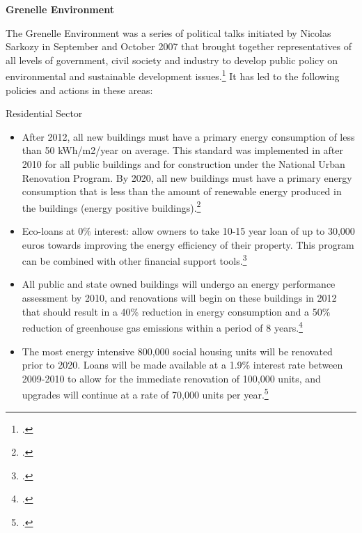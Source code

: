 \textbf{Grenelle Environment}



The Grenelle Environment was a series of political talks initiated by Nicolas Sarkozy in September and October 2007 that brought together representatives of all levels of government, civil society and industry to develop public policy on environmental and sustainable development issues.\footcite[][]{GrenelleEnvironment}
It has led to the following policies and actions in these areas:


Residential Sector
\begin{itemize}
	\item After 2012, all new buildings must have a primary energy consumption of less than 50 kWh/m2/year on average. This standard was implemented in after 2010 for all public buildings and for construction under the National Urban Renovation Program. By 2020, all new buildings must have a primary energy consumption that is less than the amount of renewable energy produced in the buildings (energy positive buildings).\footcite[][]{GrenellePolicies}
	\item Eco-loans at 0\% interest: allow owners to take 10-15 year loan of up to 30,000 euros towards improving the energy efficiency of their property. This program can be combined with other financial support tools.\footcite[][]{GrenellePolicies}
	\item All public and state owned buildings will undergo an energy performance assessment by 2010,  and renovations will begin on these buildings in 2012 that should result in a 40\% reduction in energy consumption and a 50\% reduction of greenhouse gas emissions within a period of 8 years.\footcite[][]{GrenellePolicies}
	\item The most energy intensive 800,000 social housing units will be renovated prior to 2020. Loans will be made available at a 1.9\% interest rate between 2009-2010 to allow for the immediate renovation of 100,000 units, and upgrades will continue at a rate of 70,000 units per year.\footcite[][]{GrenellePolicies}
\end{itemize}



